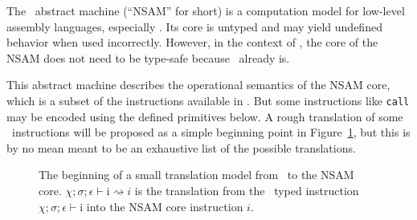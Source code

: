 
The \nstar\ abstract machine (``NSAM'' for short) is a computation model for low-level assembly languages, especially \nstar.
Its core is untyped and may yield undefined behavior when used incorrectly.
However, in the context of \nstar, the core of the NSAM does not need to be type-safe because \nstar\ already is.

This abstract machine describes the operational semantics of the NSAM core, which is a subset of the instructions available in \nstar.
But some instructions like \texttt{call} may be encoded using the defined primitives below.
A rough translation of some \nstar\ instructions will be proposed as a simple beginning point in Figure~\ref{fig:nstar-nsam-translation-nstar-nsam}, but this is by no mean meant to be an exhaustive list of the possible translations.

\begin{figure}[htb]
	\centering


	\caption{The beginning of a small translation model from \nstar\ to the NSAM core. \textbf{$\chi;\sigma;\epsilon\vdash\text{i} \rightsquigarrow \textit{i}$} is the translation from the \nstar\ typed instruction \textbf{$\chi;\sigma;\epsilon\vdash\text{i}$} into the NSAM core instruction \textbf{$\textit{i}$}.}
	\label{fig:nstar-nsam-translation-nstar-nsam}
\end{figure}

